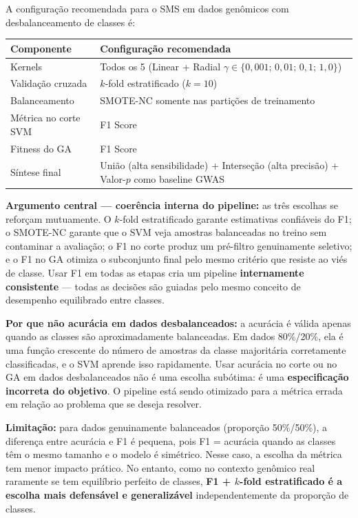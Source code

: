 \documentclass[12pt,a4paper]{article}
\newcommand{\novo}[1]{\textcolor{corNova}{#1}}
\renewcommand{\arraystretch}{1.3}
\begin{document}
\novo{A configuração recomendada para o SMS em dados genômicos com desbalanceamento de classes é:}

\begin{center}
\footnotesize
\renewcommand{\arraystretch}{1.5}
\begin{tabular}{L{4.5cm}|L{9.0cm}}
  \textbf{Componente} & \textbf{Configuração recomendada} \\
  \hline
  Kernels & Todos os 5 (Linear + Radial $\gamma \in \{0{,}001;\, 0{,}01;\, 0{,}1;\, 1{,}0\}$) \\
  \hline
  Validação cruzada & $k$-fold estratificado ($k = 10$) \\
  \hline
  Balanceamento & SMOTE-NC somente nas partições de treinamento \\
  \hline
  Métrica no corte SVM & F1 Score \\
  \hline
  Fitness do GA & F1 Score \\
  \hline
  Síntese final & União (alta sensibilidade) + Interseção (alta precisão) + Valor-$p$ como baseline GWAS \\
\end{tabular}
\end{center}
\renewcommand{\arraystretch}{1.3}

\novo{\textbf{Argumento central --- coerência interna do pipeline:} as três escolhas se reforçam mutuamente. O $k$-fold estratificado garante estimativas confiáveis do F1; o SMOTE-NC garante que o SVM veja amostras balanceadas no treino sem contaminar a avaliação; o F1 no corte produz um pré-filtro genuinamente seletivo; e o F1 no GA otimiza o subconjunto final pelo mesmo critério que resiste ao viés de classe. Usar F1 em todas as etapas cria um pipeline \textbf{internamente consistente} --- todas as decisões são guiadas pelo mesmo conceito de desempenho equilibrado entre classes.}

\novo{\textbf{Por que não acurácia em dados desbalanceados:} a acurácia é válida apenas quando as classes são aproximadamente balanceadas. Em dados 80\%/20\%, ela é uma função crescente do número de amostras da classe majoritária corretamente classificadas, e o SVM aprende isso rapidamente. Usar acurácia no corte ou no GA em dados desbalanceados não é uma escolha subótima: é uma \textbf{especificação incorreta do objetivo}. O pipeline está sendo otimizado para a métrica errada em relação ao problema que se deseja resolver.}

\novo{\textbf{Limitação:} para dados genuinamente balanceados (proporção 50\%/50\%), a diferença entre acurácia e F1 é pequena, pois F1 = acurácia quando as classes têm o mesmo tamanho e o modelo é simétrico. Nesse caso, a escolha da métrica tem menor impacto prático. No entanto, como no contexto genômico real raramente se tem equilíbrio perfeito de classes, \textbf{F1 + $k$-fold estratificado é a escolha mais defensável e generalizável} independentemente da proporção de classes.}
\end{document}
